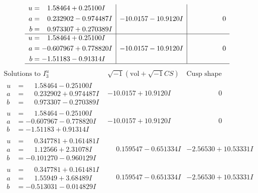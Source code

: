 \documentclass[1p]{elsarticle_modified}
\theoremstyle{definition}
\newcommand{\I}{\sqrt{-1}}
\begin{document}
$$\begin{array}{c|c|c}
\begin{aligned}
u &= \phantom{-}1.58464 + 0.25100 I \\
a &= \phantom{-}0.232902 - 0.974487 I \\
b &= \phantom{-}0.973307 + 0.270389 I\end{aligned}
 & -10.0157 - 10.9120 I & \phantom{-0.000000 } 0 \\ \hline\begin{aligned}
u &= \phantom{-}1.58464 + 0.25100 I \\
a &= -0.607967 + 0.778820 I \\
b &= -1.51183 - 0.91314 I\end{aligned}
 & -10.0157 - 10.9120 I & \phantom{-0.000000 } 0\\
 \hline 
 \end{array}$$\newpage$$\begin{array}{c|c|c}  
\text{Solutions to }I^u_{3}& \I (\text{vol} + \sqrt{-1}CS) & \text{Cusp shape}\\
 \hline 
\begin{aligned}
u &= \phantom{-}1.58464 - 0.25100 I \\
a &= \phantom{-}0.232902 + 0.974487 I \\
b &= \phantom{-}0.973307 - 0.270389 I\end{aligned}
 & -10.0157 + 10.9120 I & \phantom{-0.000000 } 0 \\ \hline\begin{aligned}
u &= \phantom{-}1.58464 - 0.25100 I \\
a &= -0.607967 - 0.778820 I \\
b &= -1.51183 + 0.91314 I\end{aligned}
 & -10.0157 + 10.9120 I & \phantom{-0.000000 } 0 \\ \hline\begin{aligned}
u &= \phantom{-}0.347781 + 0.161481 I \\
a &= \phantom{-}1.12566 + 2.31078 I \\
b &= -0.101270 - 0.960129 I\end{aligned}
 & \phantom{-}0.159547 - 0.651334 I & -2.56530 + 10.53331 I \\ \hline\begin{aligned}
u &= \phantom{-}0.347781 + 0.161481 I \\
a &= \phantom{-}1.55949 + 3.68489 I \\
b &= -0.513031 - 0.014829 I\end{aligned}
 & \phantom{-}0.159547 - 0.651334 I & -2.56530 + 10.53331 I \\ \hline\begin{aligned}

\end{aligned}
\end{array}$$
\end{document}

